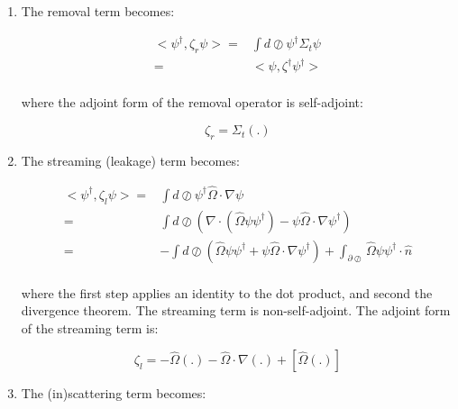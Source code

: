 \documentclass[10pt]{article}
\begin{document}
\begin{flushleft}
\begin{enumerate}
\item The removal term becomes:

\begin{equation}
\begin{aligned}
<\psi^\dagger,\zeta_r\psi>= & \int d\oslash \psi^\dagger \Sigma_t\psi\\
= & <\psi,\zeta^\dagger\psi^\dagger>\\
\end{aligned}
\end{equation}

where the adjoint form of the removal operator is self-adjoint:

\begin{equation}
\zeta_r=\Sigma_t(.)
\end{equation}

\item The streaming (leakage) term becomes:

\begin{equation}
\begin{aligned}
<\psi^\dagger,\zeta_l\psi>= & \int d\oslash \psi^\dagger\hat{\Omega}\cdot\nabla\psi\\
= & \int d\oslash \left(\nabla\cdot(\hat{\Omega}\psi\psi^\dagger)-\psi\hat{\Omega}\cdot\nabla\psi^\dagger\right)\\
= & -\int d\oslash \left(\hat{\Omega}\psi\psi^\dagger +\psi\hat{\Omega}\cdot\nabla\psi^\dagger\right)+ \int_{\partial\oslash}\hat{\Omega}\psi\psi^\dagger\cdot\hat{n}\\
\end{aligned}
\end{equation}

where the first step applies an identity to the dot product, and second the divergence theorem. The streaming term is non-self-adjoint. The adjoint form of the streaming term is:

\begin{equation}
\zeta_l=-\hat{\Omega}(.)-\hat{\Omega}\cdot\nabla(.)+\left\lbrack\hat{\Omega}(.)\right\rbrack
\end{equation}

\item The (in)scattering term becomes:


\end{enumerate}
\end{flushleft}
\end{document}
